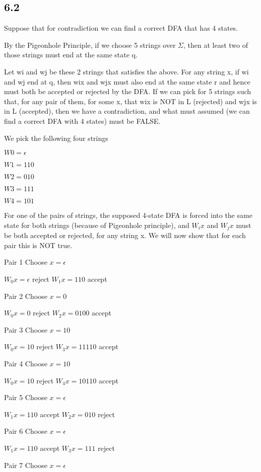 \documentclass[a4paper, 11pt]{article}
\begin{document}
\subsection*{6.2}

Suppose that for contradiction we can find a correct DFA that has 4 states.

By the Pigeonhole Principle, if we choose 5 strings over $\Sigma$, then at least two of those strings must end at the same state q.

Let wi and wj be these 2 strings that satisfies the above.
For any string x, if wi and wj end at q, then wix and wjx must also end at the
same state r and hence must both be accepted or rejected by the DFA.
If we can pick for 5 strings such that, for any pair of them, for some x, that
wix is NOT in L (rejected) and wjx is in L (accepted), then we have a
contradiction, and what must assumed (we can find a correct DFA with 4
states) must be FALSE. 

We pick the following four strings

$W0 = \epsilon$

$W1 = 110$

$W2 = 010$

$W3 = 111$

$W4 = 101$

For one of the pairs of strings, the supposed 4-state DFA is forced into the same state for both strings (because of Pigeonhole principle), and $W_ix$ and $W_jx$ must be both accepted or rejected, for any string x. We will now show that for each pair this is NOT true.

Pair 1
Choose $x = \epsilon$

$W_0x = \epsilon$ reject $W_1x = 110$ accept

Pair 2
Choose $x = 0$

$W_0x = 0$ reject $W_2x = 0100$ accept

Pair 3
Choose $x = 10$

$W_0x = 10$ reject $W_3x = 11110$ accept

Pair 4
Choose $x = 10$

$W_0x = 10$ reject $W_4x = 10110$ accept

Pair 5
Choose $x = \epsilon$

$W_1x = 110$ accept $W_2x = 010$ reject

Pair 6
Choose $x = \epsilon$

$W_1x = 110$ accept $W_3x = 111$ reject

Pair 7
Choose $x = \epsilon$
\end{document}
